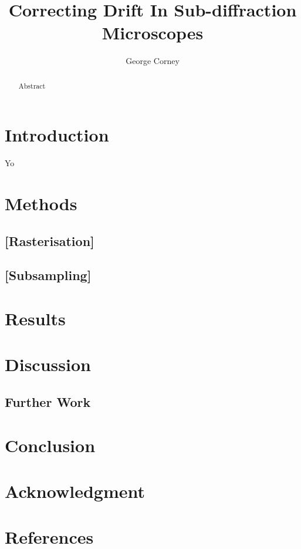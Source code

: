 \documentclass[12pt,a4paper,final]{iopart}
\begin{document}
\title[]{Correcting Drift In Sub-diffraction Microscopes}

\author{George Corney}


\begin{abstract}
Abstract

\end{abstract}


\section{Introduction}
Yo \cite{vandeLinde:2008koa}

\section{Methods}
\subsection{[Rasterisation]}

\subsection{[Subsampling]}

\section{Results}

\section{Discussion}

\subsection{Further Work}

\section{Conclusion}

\section{Acknowledgment}

\section*{References}
 

\end{document}
